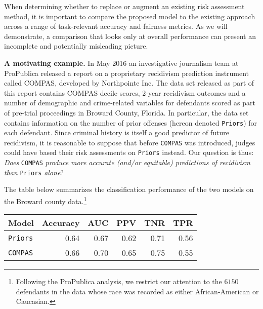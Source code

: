 \documentclass[11pt, sigconf, svgnames]{acmart}
\begin{document}
When determining whether to replace or augment an existing risk assessment method, it is important to compare the proposed model to the existing approach across a range of task-relevant accuracy and fairness metrics.  As we will demonstrate, a comparison that looks only at overall performance can present an incomplete and potentially misleading picture.  

\vspace{0.5em}

\noindent \textbf{A motivating example.}  In May 2016 an investigative journalism team at ProPublica released a report \cite{propublica2016} on a proprietary recidivism prediction instrument called COMPAS\cite{compasfaq}, developed by Northpointe Inc.  The data set \cite{propublica2016data} released as part of this report contains COMPAS decile scores, 2-year recidivism outcomes and a number of demographic and crime-related variables for defendants scored as part of pre-trial proceedings in Broward County, Florida.  In particular, the data set contains information on the number of prior offenses (hereon denoted \texttt{Priors}) for each defendant.  Since criminal history is itself a good predictor of future recidivism, it is reasonable to suppose that before \texttt{COMPAS} was introduced, judges could have based their risk assessments on \texttt{Priors} instead.  Our question is thus: \emph{Does} \texttt{COMPAS} \emph{produce more accurate (and/or equitable) predictions of recidivism than} \texttt{Priors} \emph{alone}?


The table below summarizes the classification performance of the two models on the Broward county data.\footnote{Following the ProPublica analysis, we restrict our attention to the $6150$ defendants in the data whose race was recorded as either African-American or Caucasian. }

\vspace{1em} 

\begin{center}
\begin{tabular}{lrrrrr}
    \toprule
    Model        & Accuracy & AUC  & PPV  & TNR  & TPR  \\
    \midrule                              
    \texttt{Priors}  & 0.64  & 0.67 & 0.62  & 0.71 & 0.56 \\
    \texttt{COMPAS}  & 0.66  & 0.70 & 0.65  & 0.75 & 0.55 \\

  \bottomrule
\end{tabular}
\end{center}
\end{document}
